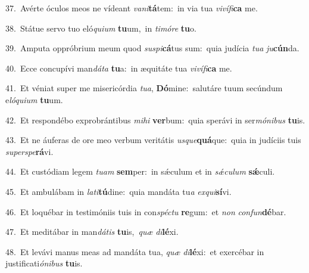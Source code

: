 {\numbfont\textcolor{\numbcolor}{37.}}~Avérte óculos meos ne vídeant \textit{va}\-\textit{ni}\textbf{tá}tem:~\star in via tua \textit{vi}\-\textit{ví}\textit{fi}\textbf{ca} me.\par
{\numbfont\textcolor{\numbcolor}{38.}}~Státue servo tuo eló\-\textit{qui}\-\textit{um} \textbf{tu}\-um,~\star in \textit{ti}\-\textit{mó}\textit{re} \textbf{tu}\-o.\par
{\numbfont\textcolor{\numbcolor}{39.}}~Amputa oppróbrium meum quod \textit{su}\-\textit{spi}\textbf{cá}tus sum:~\star quia judícia \textit{tu}\-\textit{a} \textit{ju}\-\textbf{cún}da.\par
{\numbfont\textcolor{\numbcolor}{40.}}~Ecce concupívi man\-\textit{dá}\-\textit{ta} \textbf{tu}\-a:~\star in æquitáte tua \textit{vi}\-\textit{ví}\textit{fi}\textbf{ca} me.\par
{\numbfont\textcolor{\numbcolor}{41.}}~Et véniat super me misericórdia \textit{tu}\-\textit{a}, \textbf{Dó}\-mine:~\star salutáre tuum secúndum e\-\textit{ló}\-\textit{qui}\textit{um} \textbf{tu}\-um.\par
{\numbfont\textcolor{\numbcolor}{42.}}~Et respondébo exprobrántibus \textit{mi}\-\textit{hi} \textbf{ver}\-bum:~\star quia sperávi in ser\-\textit{mó}\-\textit{ni}\textit{bus} \textbf{tu}\-is.\par
{\numbfont\textcolor{\numbcolor}{43.}}~Et ne áuferas de ore meo verbum veritátis \textit{us}\-\textit{que}\textbf{quá}que:~\star quia in judíciis tuis \textit{su}\-\textit{per}\textit{spe}\textbf{rá}vi.\par
{\numbfont\textcolor{\numbcolor}{44.}}~Et custódiam legem \textit{tu}\-\textit{am} \textbf{sem}\-per:~\star in sǽculum et in \textit{sǽ}\-\textit{cu}\textit{lum} \textbf{sǽ}\-culi.\par
{\numbfont\textcolor{\numbcolor}{45.}}~Et ambulábam in \textit{la}\-\textit{ti}\textbf{tú}dine:~\star quia mandáta tu\textit{a} \textit{ex}\-\textit{qui}\textbf{sí}vi.\par
{\numbfont\textcolor{\numbcolor}{46.}}~Et loquébar in testimóniis tuis in con\-\textit{spéc}\-\textit{tu} \textbf{re}\-gum:~\star et \textit{non} \textit{con}\-\textit{fun}\textbf{dé}bar.\par
{\numbfont\textcolor{\numbcolor}{47.}}~Et meditábar in man\-\textit{dá}\-\textit{tis} \textbf{tu}\-is,~\star \textit{quæ} \textit{di}\-\textbf{lé}xi.\par
{\numbfont\textcolor{\numbcolor}{48.}}~Et levávi manus meas ad mandáta tua, \textit{quæ} \textit{di}\-\textbf{lé}xi:~\star et exercébar in justificati\-\textit{ó}\-\textit{ni}\textit{bus} \textbf{tu}\-is.\par
